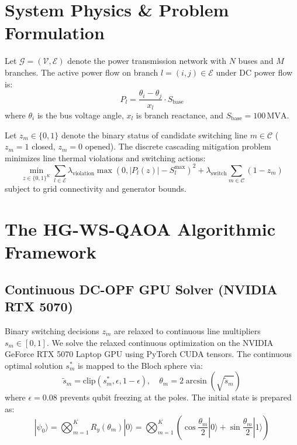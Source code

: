 \documentclass[conference]{IEEEtran}
\begin{document}
\section{System Physics \& Problem Formulation}
Let $\mathcal{G} = (\mathcal{V}, \mathcal{E})$ denote the power transmission network with $N$ buses and $M$ branches. The active power flow on branch $l = (i, j) \in \mathcal{E}$ under DC power flow is:
\begin{equation}
P_l = \frac{\theta_i - \theta_j}{x_l} \cdot S_{\text{base}}
\end{equation}
where $\theta_i$ is the bus voltage angle, $x_l$ is branch reactance, and $S_{\text{base}} = 100\,\text{MVA}$.

Let $z_m \in \{0, 1\}$ denote the binary status of candidate switching line $m \in \mathcal{C}$ ($z_m = 1$ closed, $z_m = 0$ opened). The discrete cascading mitigation problem minimizes line thermal violations and switching actions:
\begin{equation}
\min_{z \in \{0, 1\}^K} \sum_{l \in \mathcal{E}} \lambda_{\text{violation}} \max\left(0, |P_l(z)| - S_l^{\max}\right)^2 + \lambda_{\text{switch}} \sum_{m \in \mathcal{C}} (1 - z_m)
\end{equation}
subject to grid connectivity and generator bounds.

\section{The HG-WS-QAOA Algorithmic Framework}

\subsection{Continuous DC-OPF GPU Solver (NVIDIA RTX 5070)}
Binary switching decisions $z_m$ are relaxed to continuous line multipliers $s_m \in [0, 1]$. We solve the relaxed continuous optimization on the NVIDIA GeForce RTX 5070 Laptop GPU using PyTorch CUDA tensors. The continuous optimal solution $s_m^*$ is mapped to the Bloch sphere via:
\begin{equation}
\tilde{s}_m = \text{clip}(s_m^*, \epsilon, 1 - \epsilon), \quad \theta_m = 2 \arcsin(\sqrt{\tilde{s}_m})
\end{equation}
where $\epsilon = 0.08$ prevents qubit freezing at the poles. The initial state is prepared as:
\begin{equation}
|\psi_0\rangle = \bigotimes_{m=1}^K R_y(\theta_m) |0\rangle = \bigotimes_{m=1}^K \left(\cos\frac{\theta_m}{2}|0\rangle + \sin\frac{\theta_m}{2}|1\rangle\right)
\end{equation}
\end{document}
